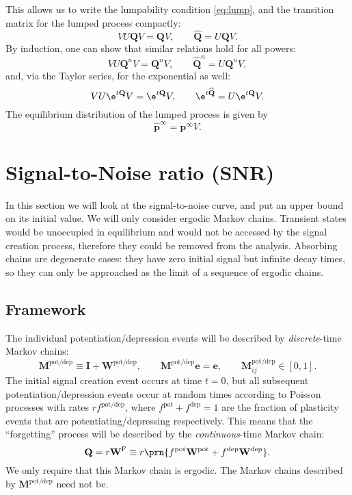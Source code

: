 \documentclass{article} %
\newcommand{\I}{\mathbf{I}}
\newcommand{\onev}{\mathbf{e}}
\newcommand{\MM}{\mathbf{Q}}
\newcommand{\pr}{\mathbf{p}}
\newcommand{\eq}{\pr^\infty}
\newcommand{\W}{\mathbf{W}}
\newcommand{\M}{\mathbf{M}}
\newcommand{\frg}{\W^{\mathrm{F}}}
\newcommand{\pot}{^{\text{pot}}}
\newcommand{\dep}{^{\text{dep}}}
\newcommand{\potdep}{^{\text{pot/dep}}}
\begin{document}
This allows us to write the lumpability condition \eqref{eq:lump}, and the transition matrix for the lumped process compactly:
%
\begin{equation}\label{eq:lumpcompact}
  VU\MM V = \MM V,
  \qquad
  \widehat{\MM} = U\MM V.
\end{equation}
%
By induction, one can show that similar relations hold for all powers:
%
\begin{equation}\label{eq:lumppower}
  VU\MM^nV = \MM^nV,
  \qquad
  \widehat{\MM}^n = U\MM^n V,
\end{equation}
%
and, via the Taylor series, for the exponential as well:
%
\begin{equation}\label{eq:lumpexp}
  VU \e^{t\MM} V = \e^{t\MM}V,
  \qquad
  \e^{t\widehat{\MM}} = U\e^{t\MM} V.
\end{equation}
%
The equilibrium distribution of the lumped process is given by
%
\begin{equation}\label{eq:lumpeq}
  \widehat{\mathbf{p}}^\infty = \eq V.
\end{equation}
%
\section{Signal-to-Noise ratio (SNR)}\label{sec:SNR}

In this section we will look at the signal-to-noise curve, and put an upper bound on its initial value.
We will only consider ergodic Markov chains.
Transient states would be unoccupied in equilibrium and would not be accessed by the signal creation process, therefore they could be removed from the analysis.
Absorbing chains are degenerate cases: they have zero initial signal but infinite decay times, so they can only be approached as the limit of a sequence of ergodic chains.

\subsection{Framework}\label{sec:framework}

The individual potentiation/depression events will be described by \emph{discrete}-time Markov chains:
%
\begin{equation}\label{eq:MWdef}
  \M\potdep \equiv \I + \W\potdep,
  \qquad
  \M\potdep\onev = \onev,
  \qquad
  \M\potdep_{ij} \in [0,1].
\end{equation}
%
The initial signal creation event occurs at time $t=0$, but all subsequent potentiation/depression events occur at random times according to Poisson processes with rates $rf\potdep$, where $f\pot +f\dep =1$ are the fraction of plasticity events that are potentiating/depressing respectively.
This means that the ``forgetting'' process will be described by the \emph{continuous}-time Markov chain:
%
\begin{equation}\label{eq:forgetting}
  \MM = r \frg \equiv r\prn{f\pot\W\pot + f\dep\W\dep}.
\end{equation}
%
We only require that this Markov chain is ergodic. The Markov chains described by $\M\potdep $ need not be.
\end{document}

